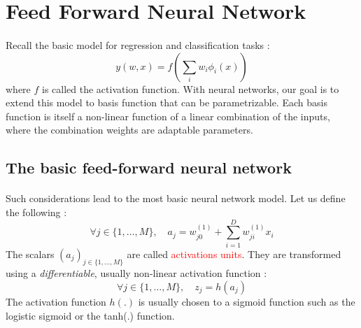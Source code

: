 \documentclass[a4paper]{article}
\begin{document}
	
		
	\vhrulefill{2pt}
	
	\tableofcontents
	
	\vhrulefill{2pt}
	
	\section{Feed Forward Neural Network}
	{
		\paragraph{} Recall the basic model for regression and classification tasks : 
		\begin{equation}
			y(w,x) = f\left(\sum_iw_i\phi_i(x)\right)
		\end{equation}
		where $f$ is called the activation function. \newline
		With neural networks, our goal is to extend this model to basis function that can be parametrizable. Each basis function is itself a non-linear function of a linear combination of the inputs, where the combination weights are adaptable parameters. 
		
		\subsection{The basic feed-forward neural network}
		{
			\paragraph{} Such considerations lead to the most basic neural network model. Let us define the following : 
			\begin{equation}
				\forall{j}\in\{1,\hdots,M\}, \quad a_j = w_{j0}^{(1)} + \sum_{i=1}^D w_{ji}^{(1)}x_i 
			\end{equation}
		The scalars $(a_j)_{j\in\{1,\hdots,M\}}$ are called {\textcolor{red}{activations units}}. They are transformed using a \emph{differentiable}, usually non-linear activation function : 
		\begin{equation}
			\forall{j}\in\{1,\hdots,M\}, \quad z_j = h(a_j)
		\end{equation}
		The activation function $h(.)$ is usually chosen to a sigmoid function such as the logistic sigmoid or the tanh(.) function. 
	
}}
\end{document}
